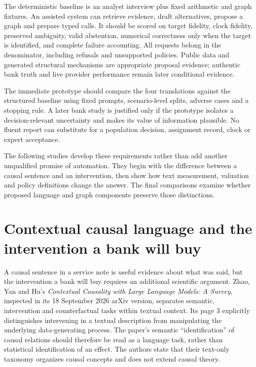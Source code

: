 The deterministic baseline is an analyst interview plus fixed arithmetic and graph fixtures. An assisted system can retrieve evidence, draft alternatives, propose a graph and prepare typed calls. It should be scored on target fidelity, clock fidelity, preserved ambiguity, valid abstention, numerical correctness only when the target is identified, and complete failure accounting. All requests belong in the denominator, including refusals and unsupported policies. Public data and generated structural mechanisms are appropriate proposal evidence; authentic bank truth and live provider performance remain later conditional evidence.

The immediate prototype should compare the four translations against the structured baseline using fixed prompts, scenario-level splits, adverse cases and a stopping rule. A later bank study is justified only if the prototype isolates a decision-relevant uncertainty and makes its value of information plausible. No fluent report can substitute for a population decision, assignment record, clock or expert acceptance.

The following studies develop these requirements rather than add another
unqualified promise of automation. They begin with the difference between a
causal sentence and an intervention, then show how text measurement, valuation
and policy definitions change the answer. The final comparisons examine
whether proposed language and graph components preserve those distinctions.


\section{Contextual causal language and the intervention a bank will buy}
\label{exec23:context-scope}

A causal sentence in a service note is useful evidence about what was said,
but the intervention a bank will buy requires an additional scientific
argument. Zhao, Yan and Hu's \emph{Contextual Causality with Large Language
Models: A Survey}, inspected in its 18 September 2026 arXiv version, separates
semantic, intervention and counterfactual tasks within textual context. Its
page 3 explicitly distinguishes intervening in a textual description from
manipulating the underlying data-generating process. The paper's semantic
``identification'' of causal relations should therefore be read as a language
task, rather than statistical identification of an effect. The authors state
that their text-only taxonomy organizes causal concepts and does not extend
causal theory.~\citep{exec23_contextual_causality_survey}

